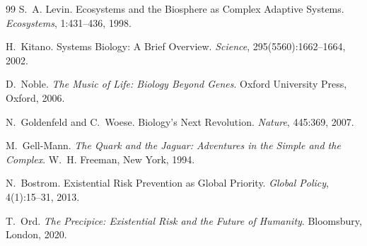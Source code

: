 \documentclass[11pt]{article}
\begin{document}
\begin{thebibliography}{99}
S.~A. Levin.
\newblock Ecosystems and the Biosphere as Complex Adaptive Systems.
\newblock \emph{Ecosystems}, 1:431--436, 1998.

H.~Kitano.
\newblock Systems Biology: A Brief Overview.
\newblock \emph{Science}, 295(5560):1662--1664, 2002.

D.~Noble.
\newblock \emph{The Music of Life: Biology Beyond Genes}.
\newblock Oxford University Press, Oxford, 2006.

N.~Goldenfeld and C.~Woese.
\newblock Biology's Next Revolution.
\newblock \emph{Nature}, 445:369, 2007.

M.~Gell-Mann.
\newblock \emph{The Quark and the Jaguar: Adventures in the Simple
and the Complex}.
\newblock W.~H. Freeman, New York, 1994.

N.~Bostrom.
\newblock Existential Risk Prevention as Global Priority.
\newblock \emph{Global Policy}, 4(1):15--31, 2013.

T.~Ord.
\newblock \emph{The Precipice: Existential Risk and the Future of Humanity}.
\newblock Bloomsbury, London, 2020.

\end{thebibliography}
\end{document}
